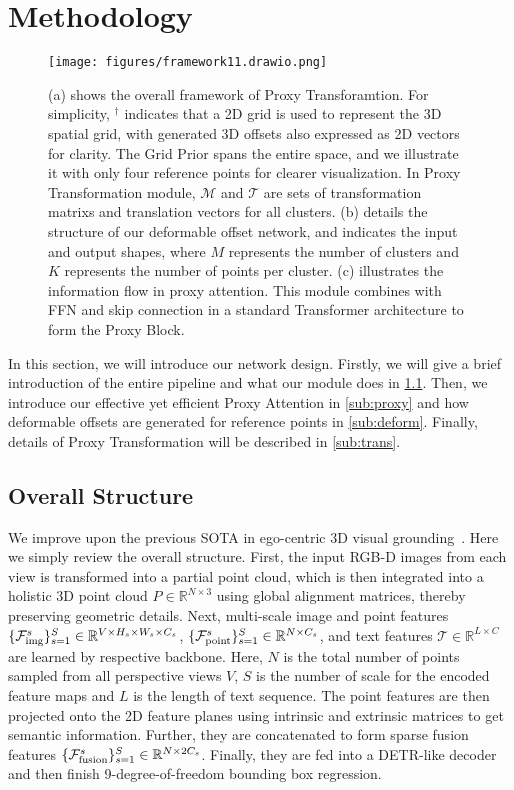 \section{Methodology}
\label{sec:method}

\begin{figure*}
    \centering
    \texttt{[image: figures/framework11.drawio.png]}
    \caption{(a) shows the overall framework of Proxy Transforamtion. For simplicity, $^\dagger$ indicates that a 2D grid is used to represent the 3D spatial grid, with generated 3D offsets also expressed as 2D vectors for clarity. The Grid Prior spans the entire space, and we illustrate it with only four reference points for clearer visualization. In Proxy Transformation module, $\mathcal{M}$ and $\mathcal{T}$ are sets of transformation matrixs and translation vectors for all clusters. (b) details the structure of our deformable offset network, and indicates the input and output shapes, where \( M \) represents the number of clusters and \( K \) represents the number of points per cluster. (c) illustrates the information flow in proxy attention. This module combines with FFN and skip connection in a standard Transformer architecture to form the Proxy Block. }
    \label{fig:framework}
\end{figure*}


In this section, we will introduce our network design. Firstly, we will give a brief introduction of the entire pipeline and what our module does in \cref{sub:overall}. Then, we introduce our effective yet efficient Proxy Attention in \cref{sub:proxy} and how deformable offsets are generated for reference points in \cref{sub:deform}. Finally, details of Proxy Transformation will be described in \cref{sub:trans}.

\subsection{Overall Structure}
\label{sub:overall}
We improve upon the previous SOTA in ego-centric 3D visual grounding~\cite{wang2023embodiedscan}. Here we simply review the overall structure. First, the input RGB-D images from each view is transformed into a partial point cloud, which is then integrated into a holistic 3D point cloud \(P \in \mathbb{R}^{N \times 3}\) using global alignment matrices, thereby preserving geometric details. Next, multi-scale image and point features \(\{\mathcal{F}^s_{\rm img}\}^S_{s=1} \in \mathbb{R}^{V \times H_s \times W_s \times C_s}\), \(\{\mathcal{F}^s_{\rm point}\}^S_{s=1} \in \mathbb{R}^{N \times C_s}\), and text features \(\mathcal{T} \in \mathbb{R}^{L \times C}\) are learned by respective backbone. Here, \(N\) is the total number of points sampled from all perspective views \(V\), \(S\) is the number of 
scale for the encoded feature maps and \(L\) is the length of text sequence. 
The point features are then projected onto the 2D feature planes using intrinsic and extrinsic matrices to get semantic information. Further, they are concatenated to form sparse fusion features \(\{\mathcal{F}^s_{\rm fusion}\}^S_{s=1} \in \mathbb{R}^{N \times 2C_s}\). Finally, they are fed into a DETR-like decoder and then finish 9-degree-of-freedom bounding box regression.

